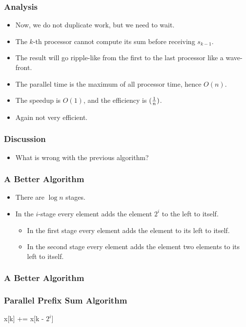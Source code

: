 \documentclass{beamer}
\begin{document}
\begin{CJK}{UTF8}{bsmi}
\begin{frame}
\frametitle{Analysis}
\begin{itemize}
\item Now, we do not duplicate work, but we need to wait.
\item The $k$-th processor cannot compute its sum before receiving $s_{k-1}$.
\item The result will go ripple-like from the first to the last processor like a wave-front.
\item The parallel time is the maximum of all processor time, hence $O(n)$.
\item The speedup is $O(1)$, and the efficiency is $({1 \over n})$. 
\item Again not very efficient.
\end{itemize}
\end{frame}

\begin{frame}
\frametitle{Discussion}
\begin{itemize}
\item What is wrong with the previous algorithm?
\end{itemize}
\end{frame}

\begin{frame}
\frametitle{A Better Algorithm}
\begin{itemize}
\item There are $\log n$ stages.
\item In the $i$-stage every element adds the element $2^i$ to the left to itself.
\begin{itemize}
  \item In the first stage every element adds the element to its left to itself.
  \item In the second stage every element adds the element two elements to its left to itself.
\end{itemize}
\end{itemize}
\end{frame}

\begin{frame}
\frametitle{A Better Algorithm}
  \frametitle{Parallel Prefix Sum Algorithm}
  \begin{algorithmic}
    \STATE x[k] += x[k - $2^i$] 
    \ENDFOR 
    \ENDFOR
  \end{algorithmic}
\end{frame}


\end{CJK}
\end{document}
